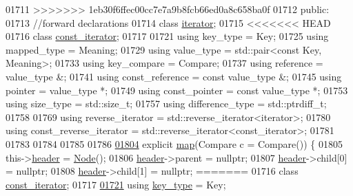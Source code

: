 \begin{DoxyCode}
01711 >>>>>>> 1eb30f6ffec00cc7e7a9b8fcb66ed0a8c658ba0f
01712     \textcolor{keyword}{public}:
01713         \textcolor{comment}{//forward declarations}
01714         \textcolor{keyword}{class }\hyperlink{classaed2_1_1iterator_1_1iterator}{iterator};
01715 
<<<<<<< HEAD
01716         \textcolor{keyword}{class }\hyperlink{classaed2_1_1iterator_1_1const__iterator}{const_iterator};
01717 
01721         \textcolor{keyword}{using} key\_type = Key;
01725         \textcolor{keyword}{using} mapped\_type = Meaning;
01729         \textcolor{keyword}{using} value\_type = std::pair<const Key, Meaning>;
01733         \textcolor{keyword}{using} key\_compare = Compare;
01737         \textcolor{keyword}{using} reference = value\_type &;
01741         \textcolor{keyword}{using} const\_reference = \textcolor{keyword}{const} value\_type &;
01745         \textcolor{keyword}{using} pointer = value\_type *;
01749         \textcolor{keyword}{using} const\_pointer = \textcolor{keyword}{const} value\_type *;
01753         \textcolor{keyword}{using} size\_type = std::size\_t;
01757         \textcolor{keyword}{using} difference\_type = std::ptrdiff\_t;
01758 
01769         \textcolor{keyword}{using} reverse\_iterator = std::reverse\_iterator<iterator>;
01780         \textcolor{keyword}{using} const\_reverse\_iterator = std::reverse\_iterator<const\_iterator>;
01781 
01783 
01784 
01785 
01786 
\hypertarget{map2_8h_source_l01804}{}\hyperlink{classaed2_1_1iterator_ab55f7bc4639e905d66935b56995a5b1f_ab55f7bc4639e905d66935b56995a5b1f}{01804}         \textcolor{keyword}{explicit} \hyperlink{classaed2_1_1iterator_ab55f7bc4639e905d66935b56995a5b1f_ab55f7bc4639e905d66935b56995a5b1f}{map}(Compare c = Compare()) \{
01805             this->\hyperlink{classaed2_1_1iterator_a19db18e2e77583eb1fa819e854ff9c71_a19db18e2e77583eb1fa819e854ff9c71}{header} = \hyperlink{structaed2_1_1iterator_1_1Node}{Node}();
01806             \hyperlink{classaed2_1_1iterator_a19db18e2e77583eb1fa819e854ff9c71_a19db18e2e77583eb1fa819e854ff9c71}{header}->parent = \textcolor{keyword}{nullptr};
01807             \hyperlink{classaed2_1_1iterator_a19db18e2e77583eb1fa819e854ff9c71_a19db18e2e77583eb1fa819e854ff9c71}{header}->child[0] = \textcolor{keyword}{nullptr};
01808             \hyperlink{classaed2_1_1iterator_a19db18e2e77583eb1fa819e854ff9c71_a19db18e2e77583eb1fa819e854ff9c71}{header}->child[1] = \textcolor{keyword}{nullptr};
=======
01716         \textcolor{keyword}{class }\hyperlink{classaed2_1_1iterator_1_1const__iterator}{const\_iterator};
01717 
\hyperlink{classaed2_1_1iterator_afd2dbf717b48e5921b9d7f5c97bdf16e_afd2dbf717b48e5921b9d7f5c97bdf16e}{01721}         \textcolor{keyword}{using} \hyperlink{classaed2_1_1iterator_afd2dbf717b48e5921b9d7f5c97bdf16e_afd2dbf717b48e5921b9d7f5c97bdf16e}{key\_type} = Key;

\end{DoxyCode}
